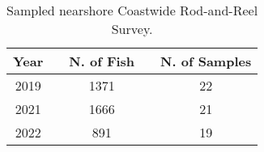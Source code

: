 \begingroup\fontsize{10}{12}\selectfont
\begingroup\fontsize{10}{12}\selectfont


\begin{table}[]
\caption{Sampled nearshore Coastwide Rod-and-Reel Survey.}
\label{tab:nearshore_survey_data}
\begin{tabular}{ccccc}
\hline
\multicolumn{1}{l}{Year} & \multicolumn{1}{l}{} & \multicolumn{1}{l}{N. of Fish} & \multicolumn{1}{l}{} & \multicolumn{1}{l}{N. of Samples} \\ \hline
2019 &  & 1371 &  & 22 \\
2021 &  & 1666 &  & 21 \\
2022 &  & 891 &  & 19 \\ \hline
\end{tabular}
\end{table}
\endgroup{}
\endgroup{}